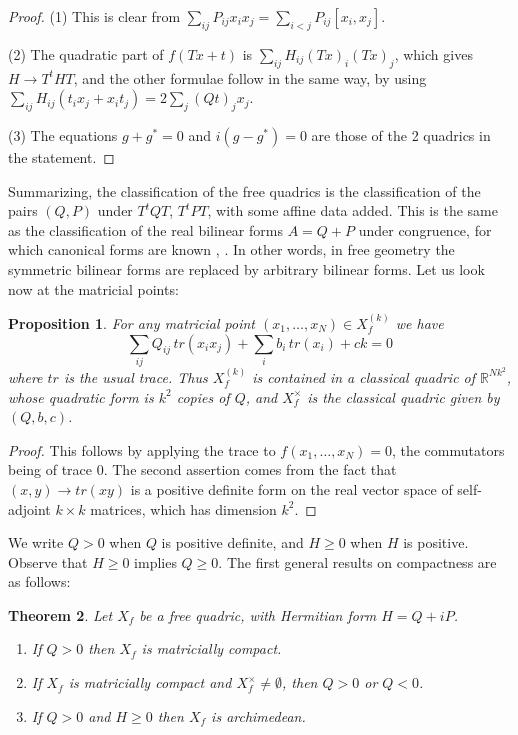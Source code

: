 \documentclass[11pt]{amsart}
\newtheorem{theorem}{Theorem}[section]
\newtheorem{proposition}[theorem]{Proposition}
\theoremstyle{definition}
\begin{document}
\begin{proof}
(1) This is clear from $\sum_{ij}P_{ij}x_ix_j=\sum_{i<j}P_{ij}[x_i,x_j]$.

(2) The quadratic part of $f(Tx+t)$ is $\sum_{ij}H_{ij}(Tx)_i(Tx)_j$, which gives $H\to T^tHT$, and the other formulae follow in the same way, by using $\sum_{ij}H_{ij}(t_ix_j+x_it_j)=2\sum_j(Qt)_jx_j$.

(3) The equations $g+g^*=0$ and $i(g-g^*)=0$ are those of the 2 quadrics in the statement.
\end{proof}

Summarizing, the classification of the free quadrics is the classification of the pairs $(Q,P)$ under $T^tQT$, $T^tPT$, with some affine data added. This is the same as the classification of the real bilinear forms $A=Q+P$ under congruence, for which canonical forms are known \cite{hse}, \cite{hs2}. In other words, in free geometry the symmetric bilinear forms are replaced by arbitrary bilinear forms. Let us look now at the matricial points:

\begin{proposition}\label{p23}
For any matricial point $(x_1,\ldots,x_N)\in X_f^{(k)}$ we have
$$\sum_{ij}Q_{ij}\,tr(x_ix_j)+\sum_ib_i\,tr(x_i)+ck=0$$
where $tr$ is the usual trace. Thus $X_f^{(k)}$ is contained in a classical quadric of $\mathbb R^{Nk^2}$, whose quadratic form is $k^2$ copies of $Q$, and $X_f^\times$ is the classical quadric given by $(Q,b,c)$.
\end{proposition}

\begin{proof}
This follows by applying the trace to $f(x_1,\ldots,x_N)=0$, the commutators being of trace 0. The second assertion comes from the fact that $(x,y)\to tr(xy)$ is a positive definite form on the real vector space of self-adjoint $k\times k$ matrices, which has dimension $k^2$.
\end{proof}

We write $Q>0$ when $Q$ is positive definite, and $H\geq0$ when $H$ is positive. Observe that $H\geq0$ implies $Q\geq0$. The first general results on compactness are as follows:

\begin{theorem}\label{t24}
Let $X_f$ be a free quadric, with Hermitian form $H=Q+iP$.
\begin{enumerate}
\item If $Q>0$ then $X_f$ is matricially compact.

\item If $X_f$ is matricially compact and $X_f^\times\neq\emptyset$, then $Q>0$ or $Q<0$.

\item If $Q>0$ and $H\geq0$ then $X_f$ is archimedean.
\end{enumerate}
\end{theorem}
\end{document}

